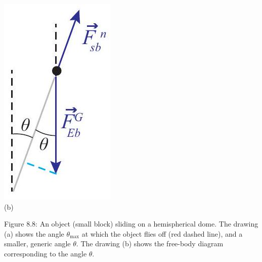 \documentclass[10pt]{article}
\begin{document}
\includegraphics[max width=\textwidth, center]{2024_09_14_9969b06773f10b6936e8g-197}\\
(b)

Figure 8.8: An object (small block) sliding on a hemispherical dome. The drawing (a) shows the angle $\theta_{\max }$ at which the object flies off (red dashed line), and a smaller, generic angle $\theta$. The drawing (b) shows the free-body diagram corresponding to the angle $\theta$.
\end{document}
